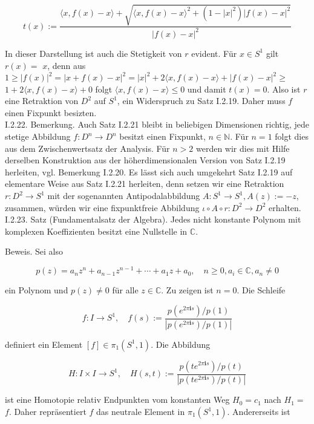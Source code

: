 \documentclass[10pt]{article}
\begin{document}
$$
t(x):=\frac{\langle x, f(x)-x\rangle+\sqrt{\langle x, f(x)-x\rangle^{2}+\left(1-|x|^{2}\right)|f(x)-x|^{2}}}{|f(x)-x|^{2}}
$$

In dieser Darstellung ist auch die Stetigkeit von $r$ evident. Für $x \in S^{1}$ gilt $r(x)=$ $x$, denn aus $1 \geq|f(x)|^{2}=|x+f(x)-x|^{2}=|x|^{2}+2\langle x, f(x)-x\rangle+|f(x)-x|^{2} \geq$ $1+2\langle x, f(x)-x\rangle+0$ folgt $\langle x, f(x)-x\rangle \leq 0$ und damit $t(x)=0$. Also ist $r$ eine Retraktion von $D^{2}$ auf $S^{1}$, ein Widerspruch zu Satz I.2.19. Daher muss $f$ einen Fixpunkt besizten.\\
I.2.22. Bemerkung. Auch Satz I.2.21 bleibt in beliebigen Dimensionen richtig, jede stetige Abbildung $f: D^{n} \rightarrow D^{n}$ besitzt einen Fixpunkt, $n \in \mathbb{N}$. Für $n=1$ folgt dies aus dem Zwischenwertsatz der Analysis. Für $n>2$ werden wir dies mit Hilfe derselben Konstruktion aus der höherdimensionalen Version von Satz I.2.19 herleiten, vgl. Bemerkung I.2.20. Es lässt sich auch umgekehrt Satz I.2.19 auf elementare Weise aus Satz I.2.21 herleiten, denn setzen wir eine Retraktion $r: D^{2} \rightarrow S^{1}$ mit der sogenannten Antipodalabbildung $A: S^{1} \rightarrow S^{1}, A(z):=-z$, zusammen, würden wir eine fixpunktfreie Abbildung $\iota \circ A \circ r: D^{2} \rightarrow D^{2}$ erhalten.\\
I.2.23. Satz (Fundamentalsatz der Algebra). Jedes nicht konstante Polynom mit komplexen Koeffizienten besitzt eine Nullstelle in $\mathbb{C}$.

Beweis. Sei also

$$
p(z)=a_{n} z^{n}+a_{n-1} z^{n-1}+\cdots+a_{1} z+a_{0}, \quad n \geq 0, a_{i} \in \mathbb{C}, a_{n} \neq 0
$$

ein Polynom und $p(z) \neq 0$ für alle $z \in \mathbb{C}$. Zu zeigen ist $n=0$. Die Schleife

$$
f: I \rightarrow S^{1}, \quad f(s):=\frac{p\left(e^{2 \pi \mathbf{i} s}\right) / p(1)}{\left|p\left(e^{2 \pi \mathbf{i} s}\right) / p(1)\right|}
$$

definiert ein Element $[f] \in \pi_{1}\left(S^{1}, 1\right)$. Die Abbildung

$$
H: I \times I \rightarrow S^{1}, \quad H(s, t):=\frac{p\left(t e^{2 \pi \mathbf{i} s}\right) / p(t)}{\left|p\left(t e^{2 \pi \mathbf{i} s}\right) / p(t)\right|}
$$

ist eine Homotopie relativ Endpunkten vom konstanten Weg $H_{0}=c_{1}$ nach $H_{1}=$ $f$. Daher repräsentiert $f$ das neutrale Element in $\pi_{1}\left(S^{1}, 1\right)$. Andererseits ist
\end{document}
